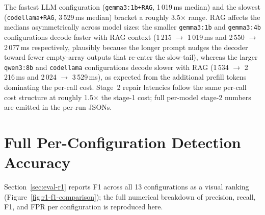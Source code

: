 The fastest LLM configuration (\texttt{gemma3:1b+RAG}, 1\,019\,ms median) and the slowest (\texttt{codellama+RAG}, 3\,529\,ms median) bracket a roughly 3.5$\times$ range. RAG affects the medians asymmetrically across model sizes: the smaller \texttt{gemma3:1b} and \texttt{gemma3:4b} configurations decode faster with RAG context (1\,215 $\rightarrow$ 1\,019\,ms and 2\,550 $\rightarrow$ 2\,077\,ms respectively, plausibly because the longer prompt nudges the decoder toward fewer empty-array outputs that re-enter the slow-tail), whereas the larger \texttt{qwen3:8b} and \texttt{codellama} configurations decode slower with RAG (1\,534 $\rightarrow$ 2\,216\,ms and 2\,024 $\rightarrow$ 3\,529\,ms), as expected from the additional prefill tokens dominating the per-call cost. Stage~2 repair latencies follow the same per-call cost structure at roughly 1.5$\times$ the stage-1 cost; full per-model stage-2 numbers are emitted in the per-run JSONs.

\section{Full Per-Configuration Detection Accuracy}
\label{app:r1-full-detection}

Section~\ref{sec:eval-r1} reports F1 across all 13 configurations as a visual ranking (Figure~\ref{fig:r1-f1-comparison}); the full numerical breakdown of precision, recall, F1, and FPR per configuration is reproduced here.

